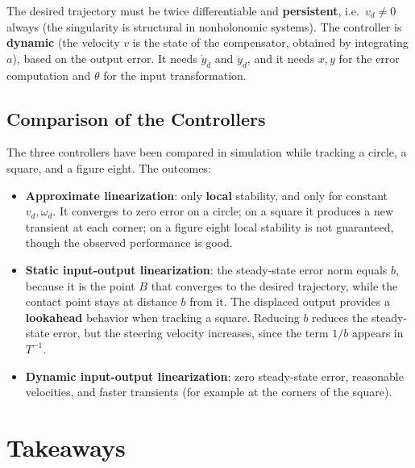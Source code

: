The desired trajectory must be twice differentiable and
\textbf{persistent}, i.e.\ \( v_d \neq 0 \) always (the singularity is
structural in nonholonomic systems). The controller is \textbf{dynamic}
(the velocity \( v \) is the state of the compensator, obtained by
integrating \( a \)), based on the output error. It needs
\( \dot{y}_d \) and \( \ddot{y}_d \), and it needs \( x, y \) for the
error computation and \( \theta \) for the input transformation.

\subsection{Comparison of the Controllers}
\label{subsec:controller-comparison}

The three controllers have been compared in simulation while tracking
a circle, a square, and a figure eight. The outcomes:
\begin{itemize}
    \item \textbf{Approximate linearization}: only \textbf{local}
          stability, and only for constant \( v_d, \omega_d \). It
          converges to zero error on a circle; on a square it produces
          a new transient at each corner; on a figure eight local
          stability is not guaranteed, though the observed performance
          is good.
    \item \textbf{Static input-output linearization}: the steady-state
          error norm equals \( b \), because it is the point \( B \)
          that converges to the desired trajectory, while the contact
          point stays at distance \( b \) from it. The displaced output
          provides a \textbf{lookahead} behavior when tracking a
          square. Reducing \( b \) reduces the steady-state error, but
          the steering velocity increases, since the term \( 1/b \)
          appears in \( T^{-1} \).
    \item \textbf{Dynamic input-output linearization}: zero
          steady-state error, reasonable velocities, and faster
          transients (for example at the corners of the square).
\end{itemize}

\section{Takeaways}
\label{sec:motion-control-takeaways}

